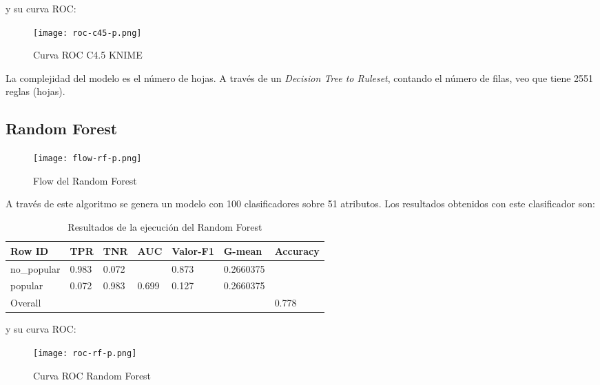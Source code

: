 y su curva ROC:

\begin{figure}[H] %
	\centering
	\texttt{[image: roc-c45-p.png]}  %
	\caption{Curva ROC C4.5 KNIME} 
	\label{fig:rocc45-p}
\end{figure}

La complejidad del modelo es el número de hojas. A través de un \textit{Decision Tree to Ruleset}, contando el número de filas, veo que tiene 2551 reglas (hojas).

\subsection{Random Forest}

\begin{figure}[H] %
	\centering
	\texttt{[image: flow-rf-p.png]}  %
	\caption{Flow del Random Forest} 
	\label{fig:flow-rf}
\end{figure}



A través de este algoritmo se genera un modelo con 100 clasificadores sobre 51 atributos. Los resultados obtenidos con este clasificador son:


\begin{table}[H]
	\centering
	\begin{tabular}{|l|l|l|l|l|l|l|}
		\hline
		Row ID      & TPR   & TNR   & AUC   & Valor-F1 & G-mean    & Accuracy \\ \hline
		no\_popular & 0.983 & 0.072 &       & 0.873    & 0.2660375 &          \\ \hline
		popular     & 0.072 & 0.983 & 0.699 & 0.127    & 0.2660375 &          \\ \hline
		Overall     &       &       &       &          &           & 0.778    \\ \hline
	\end{tabular}
	\caption{Resultados de la ejecución del Random Forest}
	\label{tab:rf}
\end{table}

y su curva ROC:

\begin{figure}[H] %
	\centering
	\texttt{[image: roc-rf-p.png]}  %
	\caption{Curva ROC Random Forest} 
	\label{fig:rocrf-p}
\end{figure}

